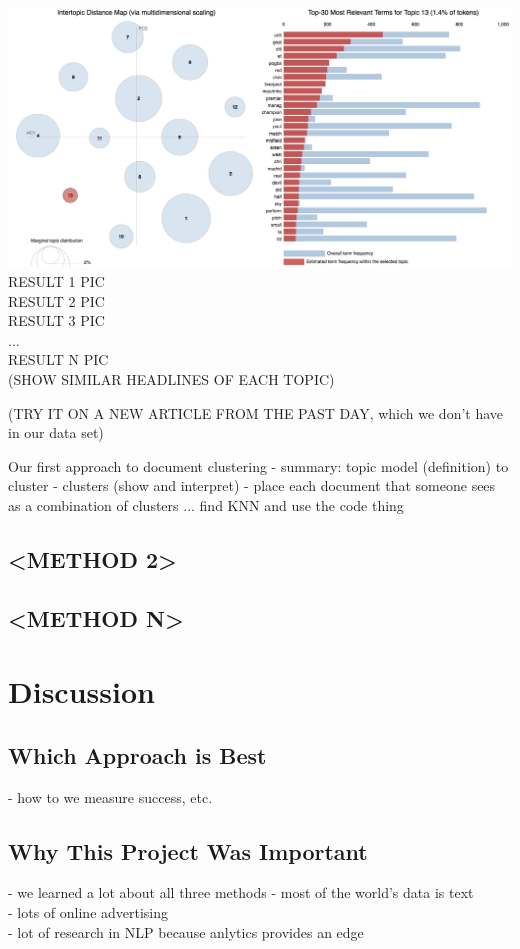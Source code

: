 \documentclass[11pt]{article}
\begin{document}
\includegraphics[width=400pt]{13.png} \\


RESULT 1 PIC \\ 
RESULT 2 PIC\\ 
RESULT 3 PIC\\

...\\

RESULT N PIC \\




(SHOW SIMILAR HEADLINES OF EACH TOPIC)


(TRY IT ON A NEW ARTICLE FROM THE PAST DAY, which we don't have in our data set)


Our first approach to document clustering 
- summary: topic model (definition) to cluster
- clusters (show and interpret)
- place each document that someone sees as a combination of clusters ... find KNN and use the code thing


\subsection{<METHOD 2>}

\subsection{<METHOD N>}



\section{Discussion}
\subsection{Which Approach is Best}
- how to we measure success, etc.

\subsection{Why This Project Was Important}
- we learned a lot about all three methods
- most of the world's data is text \\
- lots of online advertising \\
- lot of research in NLP because anlytics provides an edge \\
\end{document}
